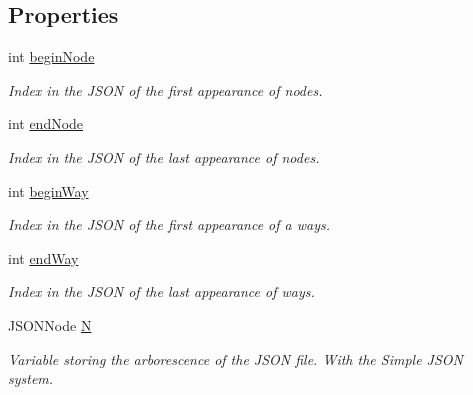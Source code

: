 \subsection*{Properties}
\begin{DoxyCompactItemize}
\item 
int \hyperlink{classParser_a43e10a5d0cd10c4fdc3f00d329f2663e}{begin\+Node}
\begin{DoxyCompactList}\small\item\em Index in the J\+S\+ON of the first appearance of nodes.\end{DoxyCompactList}\item 
int \hyperlink{classParser_a94de8556b93d0d47a9d86fd4e11c59e5}{end\+Node}
\begin{DoxyCompactList}\small\item\em Index in the J\+S\+ON of the last appearance of nodes.\end{DoxyCompactList}\item 
int \hyperlink{classParser_a08f610cc9cddb8527b5925faeb2bbb3c}{begin\+Way}
\begin{DoxyCompactList}\small\item\em Index in the J\+S\+ON of the first appearance of a ways.\end{DoxyCompactList}\item 
int \hyperlink{classParser_a4df695e129b4f2ea2246a09aa1efa7d9}{end\+Way}
\begin{DoxyCompactList}\small\item\em Index in the J\+S\+ON of the last appearance of ways.\end{DoxyCompactList}\item 
J\+S\+O\+N\+Node \hyperlink{classParser_a4197d6b1f20ecece4727304bd48919b2}{N}
\begin{DoxyCompactList}\small\item\em Variable storing the arborescence of the J\+S\+ON file. With the Simple J\+S\+ON system.\end{DoxyCompactList}\end{DoxyCompactItemize}

